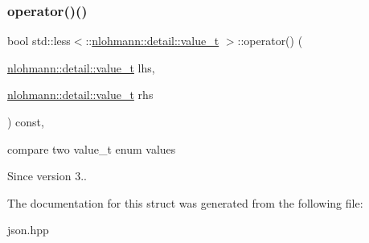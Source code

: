 \subsubsection{\texorpdfstring{operator()()}{operator()()}}
{\footnotesize\ttfamily bool std\+::less$<$\+::\mbox{\hyperlink{namespacenlohmann_1_1detail_a1ed8fc6239da25abcaf681d30ace4985}{nlohmann\+::detail\+::value\+\_\+t}} $>$\+::operator() (\begin{DoxyParamCaption}\item[{\mbox{\hyperlink{namespacenlohmann_1_1detail_a1ed8fc6239da25abcaf681d30ace4985}{nlohmann\+::detail\+::value\+\_\+t}}}]{lhs,  }\item[{\mbox{\hyperlink{namespacenlohmann_1_1detail_a1ed8fc6239da25abcaf681d30ace4985}{nlohmann\+::detail\+::value\+\_\+t}}}]{rhs }\end{DoxyParamCaption}) const\hspace{0.3cm}{\ttfamily [inline]}, {\ttfamily [noexcept]}}



compare two value\+\_\+t enum values 

\begin{DoxySince}{Since}
version 3.. 
\end{DoxySince}


The documentation for this struct was generated from the following file\+:\begin{DoxyCompactItemize}
\item 
json.\+hpp\end{DoxyCompactItemize}
